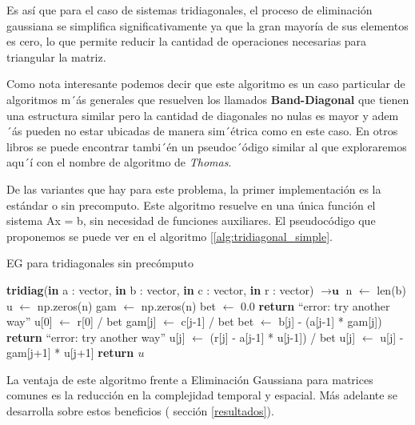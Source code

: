  Es así que para el caso de sistemas tridiagonales, el proceso de eliminación gaussiana se simplifica significativamente ya que la gran mayoría de sus elementos es cero, lo que permite reducir la cantidad de operaciones necesarias para triangular la matriz.
 
 Como nota interesante podemos decir que este algoritmo es un caso particular de algoritmos m´ás generales que resuelven los llamados \textbf{Band-Diagonal} \cite{Recipes07-Band} que tienen una estructura similar pero la cantidad de diagonales no nulas es mayor y adem´ás pueden no estar ubicadas de manera sim´étrica como en este caso. En otros libros se puede encontrar tambi´én un pseudoc´ódigo similar al que exploraremos aqu´í con el nombre de algoritmo de \textit{Thomas}. 


 De las variantes que hay para este problema, la primer implementación es la estándar o sin precomputo. Este algoritmo resuelve en una única función el sistema Ax = b, sin necesidad de funciones auxiliares. El pseudocódigo que proponemos se puede ver en el algoritmo [\ref{alg:tridiagonal_simple}.

 \begin{algorithm}
 \label{alg:tridiagonal_simple}
\caption{EG para tridiagonales sin precómputo}
\begin{algorithmic}[1]
\State \textbf{tridiag}(\textbf{in} a : vector, \textbf{in} b : vector, \textbf{in} c : vector, \textbf{in} r : vector) $\to \textbf{u}$
\State n $\gets$ len(b)
\State u $\gets$ np.zeros(n)
\State gam $\gets$ np.zeros(n)
\State bet $\gets$ 0.0
    \State \textbf{return} ``error: try another way''
\EndIf
\State u[0] $\gets$ r[0] / bet
    \State gam[j] $\gets$ c[j-1] / bet
    \State bet $\gets$ b[j] - (a[j-1] * gam[j])
        \State \textbf{return} ``error: try another way''
    \EndIf
    \State u[j] $\gets$ (r[j] - a[j-1] * u[j-1]) / bet
\EndFor
{}
    \State u[j] $\gets$ u[j] - gam[j+1] * u[j+1]
\EndFor
\State \textbf{return $u$}
\end{algorithmic}
\end{algorithm}

La ventaja de este algoritmo frente a Eliminación Gaussiana para matrices comunes es la reducción en la complejidad temporal y espacial. Más adelante se desarrolla sobre estos beneficios ( sección \ref{resultados}).



